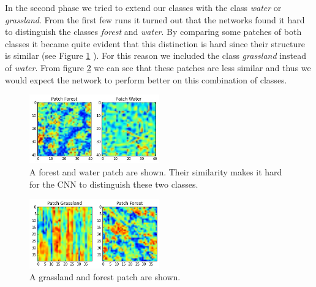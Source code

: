 \documentclass[a4paper,onecolumn]{report}
\begin{document}
In the second phase we tried to extend our classes with the class \textit{water} or \textit{grassland}. From the first few runs it turned out that the networks found it hard to distinguish the classes \textit{forest} and \textit{water}. By comparing some patches of both classes it became quite evident that this distinction is hard since their structure is similar (see Figure \ref{fig:WaterForestPatch} ). For this reason we included the class \textit{grassland} instead of \textit{water}. From figure \ref{fig:GrassForestPatch} we can see that these patches are less similar and thus we would expect the network to perform better on this combination of classes.

\begin{figure}[bth]
	\centering
	\includegraphics[width=0.5\textwidth]{./images/WaterForestPatch.jpg}
	\caption{A forest and water patch are shown. Their similarity makes it hard for the CNN to distinguish these two classes.}
	\label{fig:WaterForestPatch}
\end{figure}
\begin{figure}[bth]
	\centering
	\includegraphics[width=0.5\textwidth] {./images/GrassForestPatch.jpg}
	\caption{A grassland and forest patch are shown.}
	\label{fig:GrassForestPatch}
\end{figure}
\end{document}
